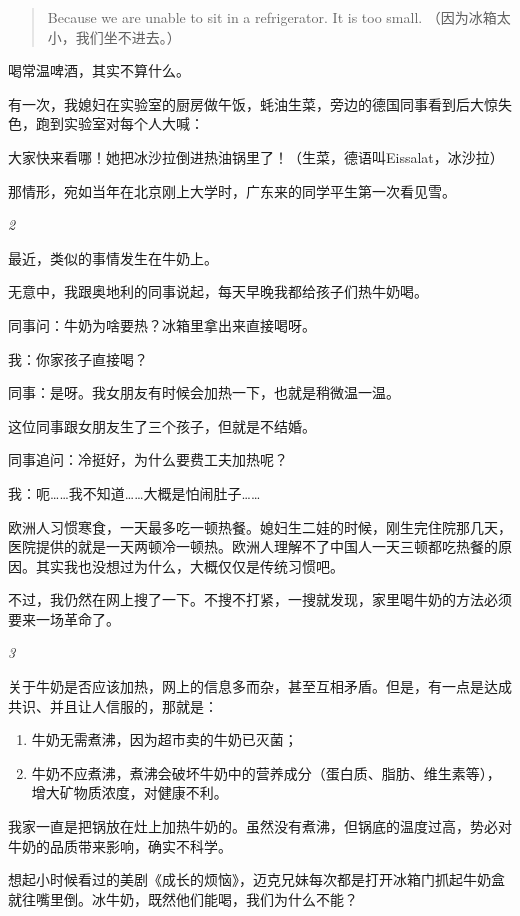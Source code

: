 \documentclass[twoside,openright,headings=optiontohead]{ctexbook} %
\providecommand{\tightlist}{%
   \setlength{\itemsep}{0pt}\setlength{\parskip}{0pt}}
\begin{document}
{\begin{quote}
Because we are unable to sit in a refrigerator. It is too small.
（因为冰箱太小，我们坐不进去。）
\end{quote}

喝常温啤酒，其实不算什么。

有一次，我媳妇在实验室的厨房做午饭，蚝油生菜，旁边的德国同事看到后大惊失色，跑到实验室对每个人大喊：

大家快来看哪！她把冰沙拉倒进热油锅里了！（生菜，德语叫Eissalat，冰沙拉）

那情形，宛如当年在北京刚上大学时，广东来的同学平生第一次看见雪。

\emph{2}

最近，类似的事情发生在牛奶上。

无意中，我跟奥地利的同事说起，每天早晚我都给孩子们热牛奶喝。

同事问：牛奶为啥要热？冰箱里拿出来直接喝呀。

我：你家孩子直接喝？

同事：是呀。我女朋友有时候会加热一下，也就是稍微温一温。

这位同事跟女朋友生了三个孩子，但就是不结婚。

同事追问：冷挺好，为什么要费工夫加热呢？

我：呃\ldots{}\ldots{}我不知道\ldots{}\ldots{}大概是怕闹肚子\ldots{}\ldots{}

欧洲人习惯寒食，一天最多吃一顿热餐。媳妇生二娃的时候，刚生完住院那几天，医院提供的就是一天两顿冷一顿热。欧洲人理解不了中国人一天三顿都吃热餐的原因。其实我也没想过为什么，大概仅仅是传统习惯吧。

不过，我仍然在网上搜了一下。不搜不打紧，一搜就发现，家里喝牛奶的方法必须要来一场革命了。

\emph{3}

关于牛奶是否应该加热，网上的信息多而杂，甚至互相矛盾。但是，有一点是达成共识、并且让人信服的，那就是：

\begin{enumerate}
\def\labelenumi{\arabic{enumi}.}
\tightlist
\item
  牛奶无需煮沸，因为超市卖的牛奶已灭菌；
\item
  牛奶不应煮沸，煮沸会破坏牛奶中的营养成分（蛋白质、脂肪、维生素等），增大矿物质浓度，对健康不利。
\end{enumerate}

我家一直是把锅放在灶上加热牛奶的。虽然没有煮沸，但锅底的温度过高，势必对牛奶的品质带来影响，确实不科学。

想起小时候看过的美剧《成长的烦恼》，迈克兄妹每次都是打开冰箱门抓起牛奶盒就往嘴里倒。冰牛奶，既然他们能喝，我们为什么不能？

}
\end{document}
